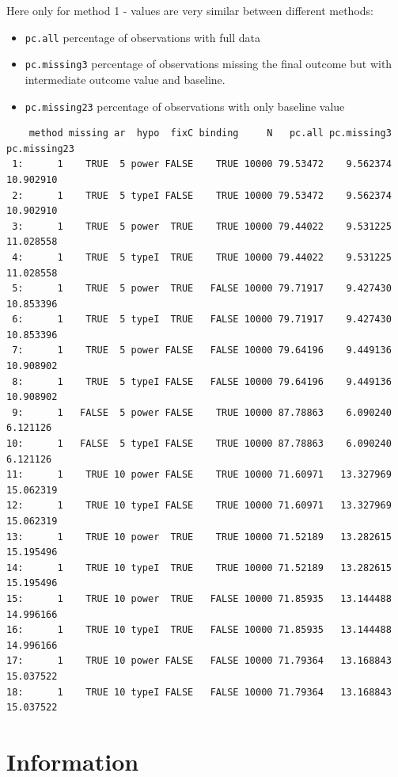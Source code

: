 \documentclass[12pt]{article}
\begin{document}
Here only for method 1 - values are very similar between different
methods:
\begin{itemize}
\item \texttt{pc.all} percentage of observations with full data
\item \texttt{pc.missing3} percentage of observations missing the final outcome
but with intermediate outcome value and baseline.
\item \texttt{pc.missing23} percentage of observations with only baseline value
\end{itemize}
\begin{verbatim}
    method missing ar  hypo  fixC binding     N   pc.all pc.missing3 pc.missing23
 1:      1    TRUE  5 power FALSE    TRUE 10000 79.53472    9.562374    10.902910
 2:      1    TRUE  5 typeI FALSE    TRUE 10000 79.53472    9.562374    10.902910
 3:      1    TRUE  5 power  TRUE    TRUE 10000 79.44022    9.531225    11.028558
 4:      1    TRUE  5 typeI  TRUE    TRUE 10000 79.44022    9.531225    11.028558
 5:      1    TRUE  5 power  TRUE   FALSE 10000 79.71917    9.427430    10.853396
 6:      1    TRUE  5 typeI  TRUE   FALSE 10000 79.71917    9.427430    10.853396
 7:      1    TRUE  5 power FALSE   FALSE 10000 79.64196    9.449136    10.908902
 8:      1    TRUE  5 typeI FALSE   FALSE 10000 79.64196    9.449136    10.908902
 9:      1   FALSE  5 power FALSE    TRUE 10000 87.78863    6.090240     6.121126
10:      1   FALSE  5 typeI FALSE    TRUE 10000 87.78863    6.090240     6.121126
11:      1    TRUE 10 power FALSE    TRUE 10000 71.60971   13.327969    15.062319
12:      1    TRUE 10 typeI FALSE    TRUE 10000 71.60971   13.327969    15.062319
13:      1    TRUE 10 power  TRUE    TRUE 10000 71.52189   13.282615    15.195496
14:      1    TRUE 10 typeI  TRUE    TRUE 10000 71.52189   13.282615    15.195496
15:      1    TRUE 10 power  TRUE   FALSE 10000 71.85935   13.144488    14.996166
16:      1    TRUE 10 typeI  TRUE   FALSE 10000 71.85935   13.144488    14.996166
17:      1    TRUE 10 power FALSE   FALSE 10000 71.79364   13.168843    15.037522
18:      1    TRUE 10 typeI FALSE   FALSE 10000 71.79364   13.168843    15.037522
\end{verbatim}

\clearpage

\section{Information}
\label{sec:org4033c5b}
\end{document}
